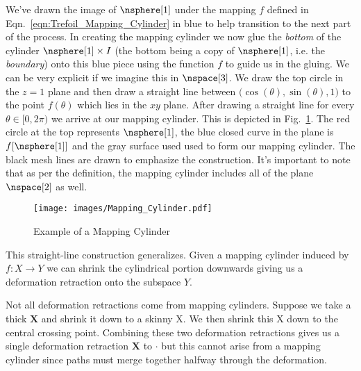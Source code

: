 \documentclass[oneside]{book}                                                  %
\begin{document}
                We've drawn the image of $\nsphere[1]$ under the mapping $f$
                defined in Eqn.~\ref{eqn:Trefoil_Mapping_Cylinder} in blue to
                help transition to the next part of the process. In creating the
                mapping cylinder we now glue the \textit{bottom} of the cylinder
                $\nsphere[1]\times{I}$ (the bottom being a copy of
                $\nsphere[1]$, i.e. the \textit{boundary}) onto this blue piece
                using the function $f$ to guide us in the gluing. We can be very
                explicit if we imagine this in $\nspace[3]$. We draw the top
                circle in the $z=1$ plane and then draw a straight line between
                $\big(\cos(\theta),\sin(\theta),1\big)$ to the point $f(\theta)$
                which lies in the $xy$ plane. After drawing a straight line for
                every $\theta\in[0,2\pi)$ we arrive at our mapping cylinder.
                This is depicted in Fig.~\ref{fig:Ex_Mapping_Cylinder}. The red
                circle at the top represents $\nsphere[1]$, the blue closed
                curve in the plane is $f[\nsphere[1]]$ and the gray surface used
                used to form our mapping cylinder. The black mesh lines are
                drawn to emphasize the construction. It's important to note that
                as per the definition, the mapping cylinder includes all of the
                plane $\nspace[2]$ as well.
                \begin{figure}[H]
                    \centering
                    \captionsetup{type=figure}
                    \texttt{[image: images/Mapping\_Cylinder.pdf]}
                    \caption{Example of a Mapping Cylinder}
                    \label{fig:Ex_Mapping_Cylinder}
                \end{figure}
                This straight-line construction generalizes. Given a mapping
                cylinder induced by $f:X\rightarrow{Y}$ we can shrink the
                cylindrical portion downwards giving us a deformation retraction
                onto the subspace $Y$.
                \par\hfill\par
                Not all deformation retractions come from mapping cylinders.
                Suppose we take a thick $\textbf{X}$ and shrink it down to a
                skinny X. We then shrink this X down to the central crossing
                point. Combining these two deformation retractions gives us a
                single deformation retraction $\textbf{X}$ to $\cdot$ but this
                cannot arise from a mapping cylinder since paths must merge
                together halfway through the deformation.
\end{document}
